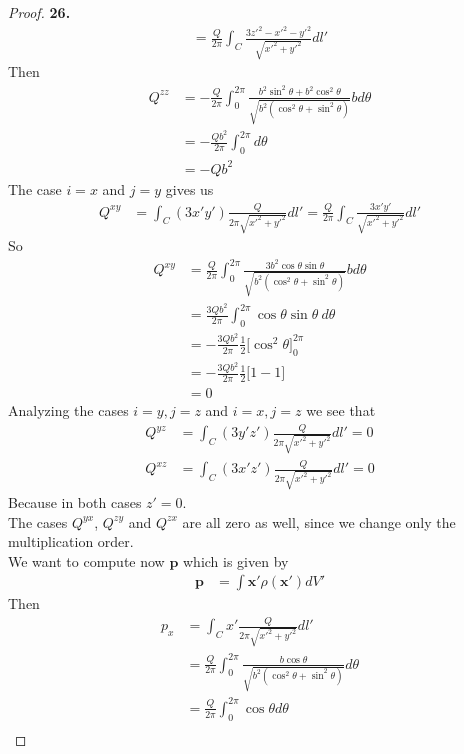 \documentclass[11pt]{article}
\theoremstyle{definition}
\begin{document}
\begin{proof}{\textbf{26.}}
\begin{align*}
    = \frac{Q}{2\pi}\int_C \frac{3z'^2 - x'^2 - y'^2}{\sqrt{x'^2 + y'^2}} dl'
\end{align*}
Then
\begin{align*}
    Q^{zz} &= -\frac{Q}{2\pi}\int_0^{2\pi}
    \frac{b^2\sin^2\theta + b^2\cos^2\theta}{\sqrt{b^2(\cos^2\theta + \sin^2\theta)}} bd\theta\\
    &= -\frac{Qb^2}{2\pi}\int_0^{2\pi} d\theta\\
    &= -Qb^2
\end{align*}
The case $i = x$ and $j = y$ gives us
\begin{align*}
    Q^{xy} &= \int_C (3x'y')\frac{Q}{2\pi \sqrt{x'^2 + y'^2}} dl'
    = \frac{Q}{2\pi}\int_C \frac{3x'y'}{\sqrt{x'^2 + y'^2}} dl'
\end{align*}
So
\begin{align*}
    Q^{xy} &= \frac{Q}{2\pi}
    \int_0^{2\pi}\frac{3b^2\cos\theta\sin\theta}{\sqrt{b^2(\cos^2\theta + \sin^2\theta)}} bd\theta\\
    &= \frac{3Qb^2}{2\pi}\int_0^{2\pi}\cos\theta\sin\theta~d\theta\\
    &= -\frac{3Qb^2}{2\pi}\frac{1}{2}\bigg[\cos^2\theta\bigg]_0^{2\pi}\\
    &= -\frac{3Qb^2}{2\pi}\frac{1}{2}\bigg[1 - 1\bigg]\\
    &= 0
\end{align*}
Analyzing the cases $i = y, j = z$ and $i = x, j = z$ we see that
\begin{align*}
    Q^{yz} &= \int_C (3y'z')\frac{Q}{2\pi \sqrt{x'^2 + y'^2}} dl'
    = 0\\
    Q^{xz} &= \int_C (3x'z')\frac{Q}{2\pi \sqrt{x'^2 + y'^2}} dl'
    = 0
\end{align*}
Because in both cases $z' = 0$.
\\
The cases $Q^{yx}$, $Q^{zy}$ and $Q^{zx}$ are all zero as well, since we change
only the multiplication order.
\\
We want to compute now $\bm{p}$ which is given by
\begin{align*}
    \bm{p} &= \int \bm{x}'\rho(\bm{x}')dV'     
\end{align*}
Then
\begin{align*}
    p_x &= \int_C x'\frac{Q}{2\pi\sqrt{x'^2 + y'^2}}dl'\\
    &= \frac{Q}{2\pi}\int_0^{2\pi}
    \frac{b\cos\theta}{\sqrt{b^2(\cos^2\theta + \sin^2\theta)}}d\theta\\
    &= \frac{Q}{2\pi}\int_0^{2\pi} \cos\theta d\theta\\

\end{align*}
\end{proof}
\end{document}
